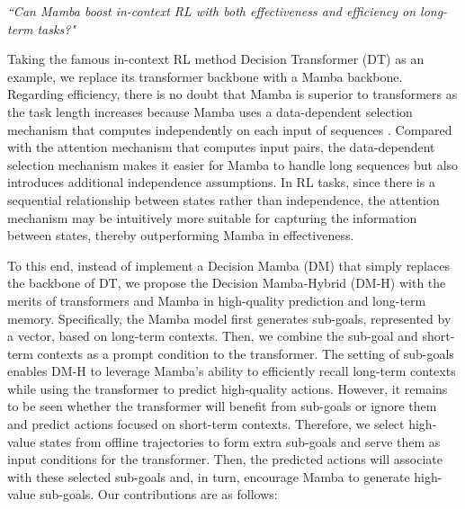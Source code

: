 \vspace{-5pt}
\begin{center}
\emph{``Can Mamba boost in-context RL with both effectiveness and efficiency on long-term tasks?"}
\end{center}
\vspace{-5pt}
Taking the famous in-context RL method Decision Transformer (DT) \cite{8} as an example, we replace its transformer backbone with a Mamba backbone. Regarding efficiency, there is no doubt that Mamba is superior to transformers as the task length increases because Mamba uses a data-dependent selection mechanism that computes independently on each input of sequences \cite{10}. Compared with the attention mechanism that computes input pairs, the data-dependent selection mechanism makes it easier for Mamba to handle long sequences but also introduces additional independence assumptions. In RL tasks, since there is a sequential relationship between states rather than independence, the attention mechanism may be intuitively more suitable for capturing the information between states, thereby outperforming Mamba in effectiveness.


To this end, instead of implement a Decision Mamba (DM) that simply replaces the backbone of DT, we propose the Decision Mamba-Hybrid (DM-H) with the merits of transformers and Mamba in high-quality prediction and long-term memory. Specifically, the Mamba model first generates sub-goals, represented by a vector, based on long-term contexts. Then, we combine the sub-goal and short-term contexts as a prompt condition to the transformer. The setting of sub-goals enables DM-H to leverage Mamba's ability to efficiently recall long-term contexts while using the transformer to predict high-quality actions. However, it remains to be seen whether the transformer will benefit from sub-goals or ignore them and predict actions focused on short-term contexts. Therefore, we select high-value states from offline trajectories to form extra sub-goals and serve them as input conditions for the transformer. Then, the predicted actions will associate with these selected sub-goals and, in turn, encourage Mamba to generate high-value sub-goals. Our contributions are as follows: 

